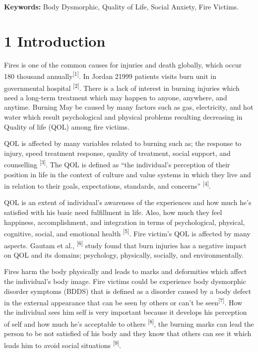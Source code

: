 \documentclass[
]{article}
\begin{document}
\textbf{Keywords:} Body Dysmorphic, Quality of Life, Social Anxiety,
Fire Victims.

\section{1 Introduction}\label{introduction}

Fires is one of the common causes for injuries and death globally, which
occur 180 thousand annually\textsuperscript{{[}1{]}}. In Jordan 21999
patients visits burn unit in governmental hospital
\textsuperscript{{[}2{]}}. There is a lack of interest in burning
injuries which need a long-term treatment which may happen to anyone,
anywhere, and anytime. Burning May be caused by many factors such as
gas, electricity, and hot water which result psychological and physical
problems resulting decreasing in Quality of life (QOL) among fire
victims.

QOL is affected by many variables related to burning such as; the
response to injury, speed treatment response, quality of treatment,
social support, and counselling \textsuperscript{{[}3{]}}. The QOL is
defined as ``the individual's perception of their position in life in
the context of culture and value systems in which they live and in
relation to their goals, expectations, standards, and concerns''
\textsuperscript{{[}4{]}}.

QOL is an extent of individual's awareness of the experiences and how
much he's satisfied with his basic need fulfillment in life. Also, how
much they feel happiness, accomplishment, and integration in terms of
psychological, physical, cognitive, social, and emotional health
\textsuperscript{{[}5{]}}. Fire victim's QOL is affected by many
aspects. Gautam et al., \textsuperscript{{[}6{]}} study found that burn
injuries has a negative impact on QOL and its domains; psychology,
physically, socially, and environmentally.

Fires harm the body physically and leads to marks and deformities which
affect the individual's body image. Fire victims could be experience
body dysmorphic disorder symptoms (BDDS) that is defined as a disorder
caused by a body defect in the external appearance that can be seen by
others or can't be seen\textsuperscript{{[}7{]}}. How the individual
sees him self is very important because it develops his perception of
self and how much he's acceptable to others \textsuperscript{{[}8{]}},
the burning marks can lead the person to be not satisfied of his body
and they know that others can see it which leads him to avoid social
situations \textsuperscript{{[}9{]}}.
\end{document}
